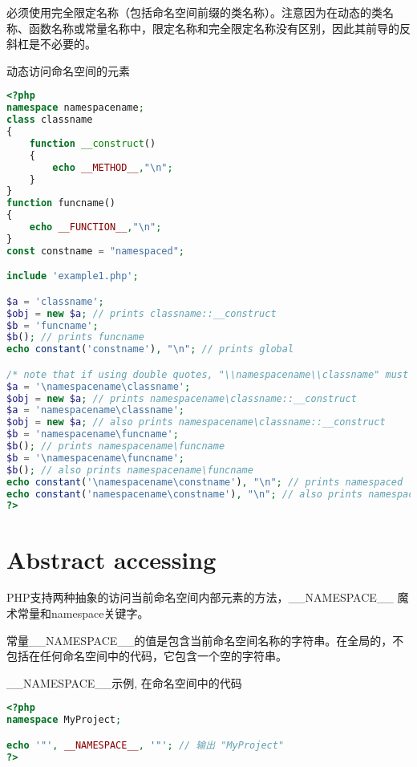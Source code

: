 必须使用完全限定名称（包括命名空间前缀的类名称）。注意因为在动态的类名称、函数名称或常量名称中，限定名称和完全限定名称没有区别，因此其前导的反斜杠是不必要的。







\begin{example}
动态访问命名空间的元素
\begin{lstlisting}[language=PHP]
<?php
namespace namespacename;
class classname
{
    function __construct()
    {
        echo __METHOD__,"\n";
    }
}
function funcname()
{
    echo __FUNCTION__,"\n";
}
const constname = "namespaced";

include 'example1.php';

$a = 'classname';
$obj = new $a; // prints classname::__construct
$b = 'funcname';
$b(); // prints funcname
echo constant('constname'), "\n"; // prints global

/* note that if using double quotes, "\\namespacename\\classname" must be used */
$a = '\namespacename\classname';
$obj = new $a; // prints namespacename\classname::__construct
$a = 'namespacename\classname';
$obj = new $a; // also prints namespacename\classname::__construct
$b = 'namespacename\funcname';
$b(); // prints namespacename\funcname
$b = '\namespacename\funcname';
$b(); // also prints namespacename\funcname
echo constant('\namespacename\constname'), "\n"; // prints namespaced
echo constant('namespacename\constname'), "\n"; // also prints namespaced
?>
\end{lstlisting}
\end{example}


\chapter{Abstract accessing}


PHP支持两种抽象的访问当前命名空间内部元素的方法，\_\_NAMESPACE\_\_ 魔术常量和namespace关键字。

常量\_\_NAMESPACE\_\_的值是包含当前命名空间名称的字符串。在全局的，不包括在任何命名空间中的代码，它包含一个空的字符串。

\begin{example}
\_\_NAMESPACE\_\_示例, 在命名空间中的代码
\begin{lstlisting}[language=PHP]
<?php
namespace MyProject;

echo '"', __NAMESPACE__, '"'; // 输出 "MyProject"
?>
\end{lstlisting}
\end{example}


